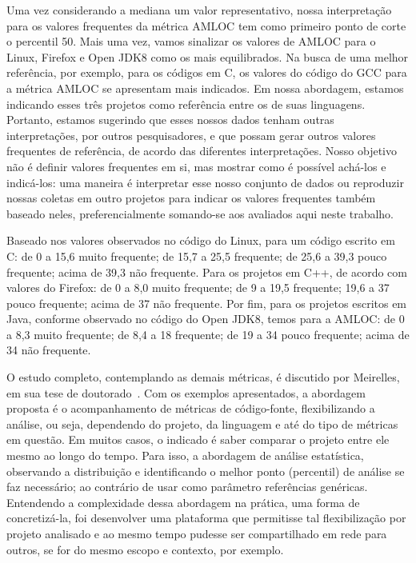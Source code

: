\documentclass{llncs}
\begin{document}
Uma vez considerando a mediana um valor representativo, nossa interpretação
para os valores frequentes da métrica AMLOC tem como primeiro ponto de corte o
percentil 50.
%
Mais uma vez, vamos sinalizar os valores de AMLOC para o Linux, Firefox e Open
JDK8 como os mais equilibrados.
%
Na busca de uma melhor referência, por exemplo, para os códigos em C, os
valores do código do GCC para a métrica AMLOC se apresentam mais indicados.
%
Em nossa abordagem, estamos indicando esses três projetos como referência entre
os de suas linguagens.
%
Portanto, estamos sugerindo que esses nossos dados tenham outras
interpretações, por outros pesquisadores, e que possam gerar outros valores
frequentes de referência, de acordo das diferentes interpretações.
%
Nosso objetivo não é definir valores frequentes em si, mas mostrar como é
possível achá-los e indicá-los: uma maneira é interpretar esse nosso conjunto
de dados ou reproduzir nossas coletas em outro projetos para indicar os valores
frequentes também baseado neles, preferencialmente somando-se aos avaliados
aqui neste trabalho.

Baseado nos valores observados no código do Linux, para um código escrito em C:
de 0 a 15,6 muito frequente; de 15,7 a 25,5 frequente; de 25,6 a 39,3 pouco
frequente; acima de 39,3 não frequente.
%
Para os projetos em C++, de acordo com valores do Firefox: de 0 a 8,0 muito
frequente; de 9 a 19,5 frequente; 19,6 a 37 pouco frequente; acima de 37 não
frequente.
%
Por fim, para os projetos escritos em Java, conforme observado no código do
Open JDK8, temos para a AMLOC: de 0 a 8,3 muito frequente; de 8,4 a 18
frequente; de 19 a 34 pouco frequente; acima de 34 não frequente.

O estudo completo, contemplando as demais métricas, é discutido por Meirelles,
em sua tese de doutorado~\cite{meirelles2013monitoramento}. Com os exemplos
apresentados, a abordagem proposta é o acompanhamento de métricas de
código-fonte, flexibilizando a análise, ou seja, dependendo do projeto, da
linguagem e até do tipo de métricas em questão.
%
Em muitos casos, o indicado é saber comparar o projeto entre ele mesmo ao longo
do tempo. Para isso, a abordagem de análise estatística, observando a
distribuição e identificando o melhor ponto (percentil) de análise se faz
necessário; ao contrário de usar como parâmetro referências genéricas.
Entendendo a complexidade dessa abordagem na prática, uma forma de
concretizá-la, foi desenvolver uma plataforma que permitisse tal flexibilização
por projeto analisado e ao mesmo tempo pudesse ser compartilhado em rede para
outros, se for do mesmo escopo e contexto, por exemplo.
\end{document}
